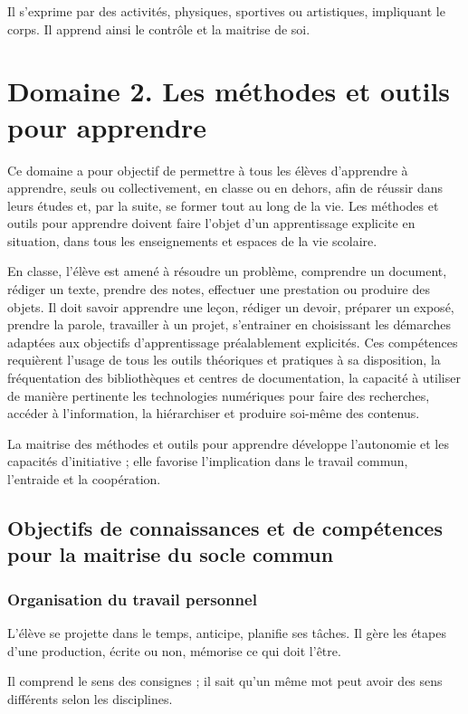 Il s’exprime par des activités, physiques, sportives ou artistiques, impliquant le corps. Il apprend ainsi le contrôle et la maitrise de soi.

\section{Domaine 2. Les méthodes et outils pour apprendre}
Ce domaine a pour objectif de permettre à tous les élèves d’apprendre à apprendre, seuls ou collectivement, en classe ou en dehors, afin de réussir dans leurs études et, par la suite, se former tout au long de la vie. Les méthodes et outils pour apprendre doivent faire l’objet d’un apprentissage explicite en situation, dans tous les enseignements et espaces de la vie scolaire.

En classe, l’élève est amené à résoudre un problème, comprendre un document, rédiger un texte, prendre des notes, effectuer une prestation ou produire des objets. Il doit savoir apprendre une leçon, rédiger un devoir, préparer un exposé, prendre la parole, travailler à un projet, s’entrainer en choisissant les démarches adaptées aux objectifs d’apprentissage préalablement explicités. Ces compétences requièrent l’usage de tous les outils théoriques et pratiques à sa disposition, la fréquentation des bibliothèques et centres de documentation, la capacité à utiliser de manière pertinente les technologies numériques pour faire des recherches, accéder à l’information, la hiérarchiser et produire soi-même des contenus.

La maitrise des méthodes et outils pour apprendre développe l’autonomie et les capacités d’initiative ; elle favorise l’implication dans le travail commun, l’entraide et la coopération.
 
\subsection{Objectifs de connaissances et de compétences pour la maitrise du socle commun}
\subsubsection{Organisation du travail personnel}
L’élève se projette dans le temps, anticipe, planifie ses tâches. Il gère les étapes d’une production, écrite ou non, mémorise ce qui doit l’être.

Il comprend le sens des consignes ; il sait qu’un même mot peut avoir des sens différents selon les disciplines.

